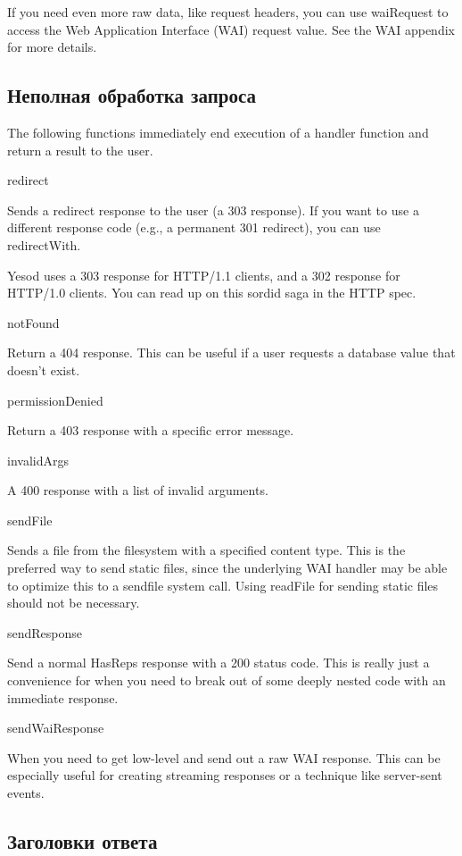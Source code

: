 If you need even more raw data, like request headers, you can use
waiRequest to access the Web Application Interface (WAI) request
value. See the WAI appendix for more details.

\subsection{Неполная обработка запроса}

The following functions immediately end execution of a handler
function and return a result to the user.

redirect

Sends a redirect response to the user (a 303 response). If you want to
use a different response code (e.g., a permanent 301 redirect), you
can use redirectWith.

Yesod uses a 303 response for HTTP/1.1 clients, and a 302 response for
HTTP/1.0 clients. You can read up on this sordid saga in the HTTP
spec.

notFound

Return a 404 response. This can be useful if a user requests a
database value that doesn't exist.

permissionDenied

Return a 403 response with a specific error message.

invalidArgs

A 400 response with a list of invalid arguments.

sendFile

Sends a file from the filesystem with a specified content type. This
is the preferred way to send static files, since the underlying WAI
handler may be able to optimize this to a sendfile system call. Using
readFile for sending static files should not be necessary.

sendResponse

Send a normal HasReps response with a 200 status code. This is really
just a convenience for when you need to break out of some deeply
nested code with an immediate response.

sendWaiResponse

When you need to get low-level and send out a raw WAI response. This
can be especially useful for creating streaming responses or a
technique like server-sent events.

\subsection{Заголовки ответа}

